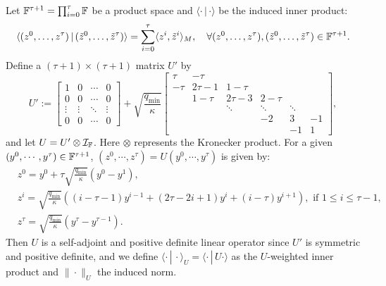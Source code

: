 Let $\mathbb{F}^{\tau+1}=\prod_{i=0}^{\tau}\mathbb{F}$ be a product space and $\langle\cdot\, |\,\cdot \rangle$ be the induced  inner product:
$$\langle (z^0,\ldots,z^{\tau})\,|\,(\tilde{z}^0,\ldots,\tilde{z}^{\tau})\rangle=\sum_{i=0}^{\tau}\langle z^i,\tilde{z}^i\rangle_M,\quad\forall (z^0,\ldots,z^{\tau}), (\tilde{z}^0,\ldots,\tilde{z}^{\tau})\in\mathbb{F}^{\tau+1}.$$ 
Define a $(\tau+1)\times(\tau+1)$ matrix $U'$ by 
\begin{equation*}%
U':=\begin{bmatrix}1 & 0 & \cdots &0\\
0 & 0 &\cdots & 0\\ \vdots &\vdots & \ddots & \vdots\\
0 & 0 &\cdots & 0 \end{bmatrix}
+\sqrt{\frac{q_{\min}}{\kappa}}\begin{bmatrix} \tau & -\tau &  & \\
-\tau & 2\tau-1 & 1-\tau & \\
 & 1-\tau & 2\tau-3 & 2-\tau  & \\
 & & \ddots & \ddots & \ddots &\\
 & & & -2 & 3  & -1 \\
 & & & &-1 & 1
\end{bmatrix},
\end{equation*}
and let $U=U'\otimes {\mathcal{I}}_{\mathbb{F}}$. Here $\otimes$ represents the Kronecker product. For a given $(y^0,\cdots,y^\tau)\in\mathbb{F}^{\tau+1}$, $(z^0,\cdots,z^\tau)=U(y^0,\cdots,y^\tau)$ is given by:
\begin{align*}
&z^0=\textstyle
y^0+\tau\sqrt{\frac{q_{\min}}{\kappa}} (y^0-y^1),\\
&z^i =
\textstyle\sqrt{\frac{q_{\min}}{\kappa}}((i-\tau-1)y^{i-1}+(2\tau-2i+1)y^i+(i-\tau)y^{i+1}),\text{ if } 1\le i\le \tau-1,\\
&z^{\tau}=\textstyle\sqrt{\frac{q_{\min}}{\kappa}} (y^{\tau}-y^{\tau-1}).
\end{align*} 
Then $U$ is a self-adjoint and positive definite linear operator since $U'$ is
symmetric and positive definite, and we define $\langle\cdot\, |\,
\cdot\rangle_U=\langle\cdot\, |\, U\cdot\rangle$ as the $U$-weighted inner
product and $\|\cdot\|_U$ the induced norm.
 
